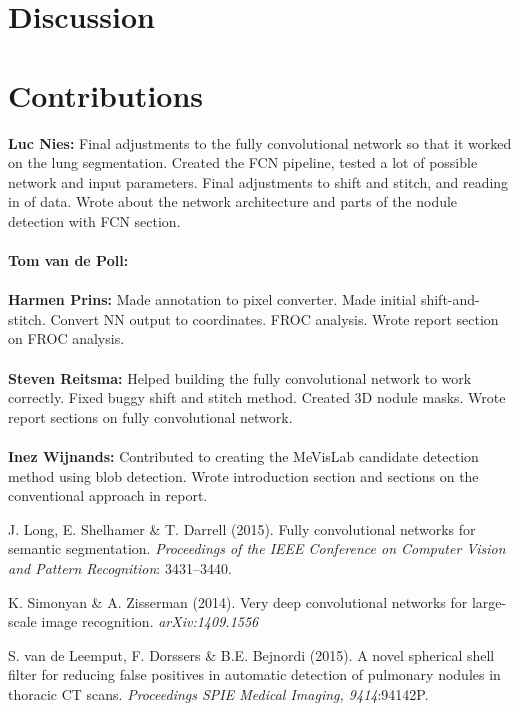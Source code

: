 \documentclass{article}
\begin{document}
\section{Discussion}\label{sec:discussion}


\appendix
\section{Contributions}
\textbf{Luc Nies:} Final adjustments to the fully convolutional network so that it worked on the lung segmentation. Created the FCN pipeline, tested a lot of possible network and input parameters. Final adjustments to shift and stitch, and reading in of data. Wrote about the network architecture and parts of the nodule detection with FCN section.\\
\\
\textbf{Tom van de Poll:} \\
\\
\textbf{Harmen Prins:} Made annotation to pixel converter. Made initial shift-and-stitch. Convert NN output to coordinates. FROC analysis. Wrote report section on FROC analysis.
\\
\\
\textbf{Steven Reitsma:} Helped building the fully convolutional network to work correctly. Fixed buggy shift and stitch method. Created 3D nodule masks. Wrote report sections on fully convolutional network. \\
\\
\textbf{Inez Wijnands:} Contributed to creating the MeVisLab candidate detection method using blob detection. Wrote introduction section and sections on the conventional approach in report.



\begin{thebibliography}{}
J. Long, E. Shelhamer \& T. Darrell (2015). Fully convolutional networks for semantic segmentation. \emph{Proceedings of the IEEE Conference on Computer Vision and Pattern Recognition}: 3431--3440.

K. Simonyan \& A. Zisserman (2014). Very deep convolutional networks for large-scale image recognition. \emph{arXiv:1409.1556}

S. van de Leemput, F. Dorssers \& B.E. Bejnordi (2015). A novel spherical shell filter for reducing false positives in automatic detection of pulmonary nodules in thoracic CT scans. \emph{Proceedings SPIE Medical Imaging, 9414}:94142P.

\end{thebibliography}
\end{document}
